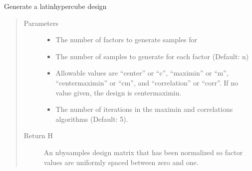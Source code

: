 \documentclass[letterpaper,12pt,english]{sphinxmanual}
\begin{document}

\begin{fulllineitems}
\label{\detokenize{PARyOpt:PARyOpt.utils.lhs}}
\sphinxAtStartPar
Generate a latin\sphinxhyphen{}hypercube design
\begin{quote}\begin{description}
\item[{Parameters}] \leavevmode\begin{itemize}
\item {} 
\sphinxAtStartPar
{} \textendash{} The number of factors to generate samples for

\item {} 
\sphinxAtStartPar
{} \textendash{} The number of samples to generate for each factor (Default: n)

\item {} 
\sphinxAtStartPar
{} \textendash{} Allowable values are “center” or “c”, “maximin” or “m”, “centermaximin” or “cm”, and     “correlation” or “corr”. If no value given, the design is centermaximin.

\item {} 
\sphinxAtStartPar
{} \textendash{} The number of iterations in the maximin and correlations algorithms (Default: 5).

\end{itemize}

\item[{Return H}] \leavevmode
\sphinxAtStartPar
An n\sphinxhyphen{}by\sphinxhyphen{}samples design matrix that has been normalized so factor values are uniformly      spaced between zero and one.


\end{description}
\end{quote}
\end{fulllineitems}
\end{document}

